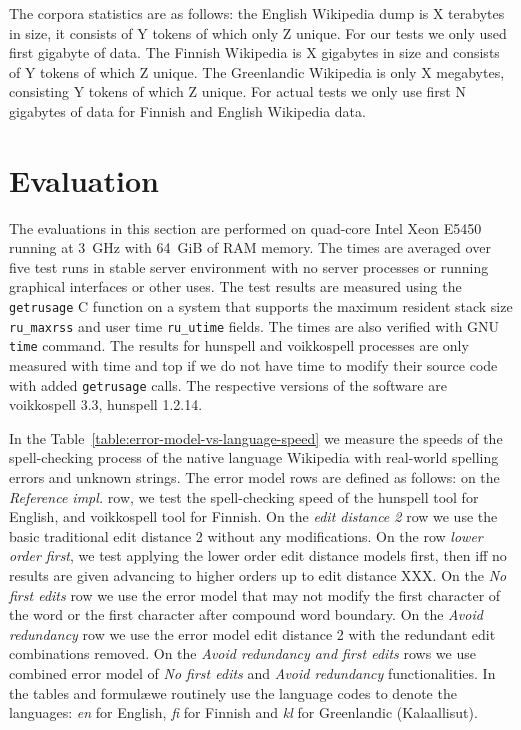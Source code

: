 \documentclass[11pt]{article}
\begin{document}
The corpora statistics are as follows: the English Wikipedia dump is X terabytes
in size, it consists of Y tokens of which only Z unique. For our tests we
only used first gigabyte of data. The Finnish Wikipedia is X gigabytes in size
and consists of Y tokens of which Z unique. The Greenlandic Wikipedia is only
X megabytes, consisting Y tokens of which Z unique. For actual tests we only use
first N gigabytes of data for Finnish and English Wikipedia data.

\section{Evaluation}
\label{sec:evaluation}

The evaluations in this section are performed on quad-core Intel Xeon E5450
running at 3~GHz with 64~GiB of RAM memory. The times are averaged over five
test runs in stable server environment with no server processes or running
graphical interfaces or other uses. The test results are measured using the
\texttt{getrusage} C function on a system that supports the maximum resident
stack size \texttt{ru\_maxrss} and user time \texttt{ru\_utime} fields. The times
are also verified with GNU \texttt{time} command. The results for hunspell and
voikkospell processes are only measured with time and top if we do not have
time to modify their source code with added \texttt{getrusage} calls. The
respective versions of the software are voikkospell 3.3, hunspell 1.2.14.

In the Table~\ref{table:error-model-vs-language-speed} we measure the speeds of
the spell-checking process of the native language Wikipedia with real-world
spelling errors and unknown strings. The error model rows are defined as
follows: on the \emph{Reference impl.} row, we test the spell-checking speed of
the hunspell tool for English, and voikkospell tool for Finnish. On the
\emph{edit distance 2} row we use the basic traditional edit distance 2 without
any modifications. On the row \emph{lower order first}, we test applying the
lower order edit distance models first, then iff no results are given advancing
to higher orders up to edit distance XXX. On the \emph{No first edits} row we
use the error model that may not modify the first character of the word or the
first character after compound word boundary. On the \emph{Avoid redundancy}
row we use the error model edit distance 2 with the redundant edit combinations
removed. On the \emph{Avoid redundancy and first edits} rows we use combined
error model of \emph{No first edits} and \emph{Avoid redundancy}
functionalities.  In the tables and formul\ae we routinely use the language
codes to denote the languages: \emph{en} for English, \emph{fi} for Finnish and
\emph{kl} for Greenlandic (Kalaallisut). 
\end{document}
